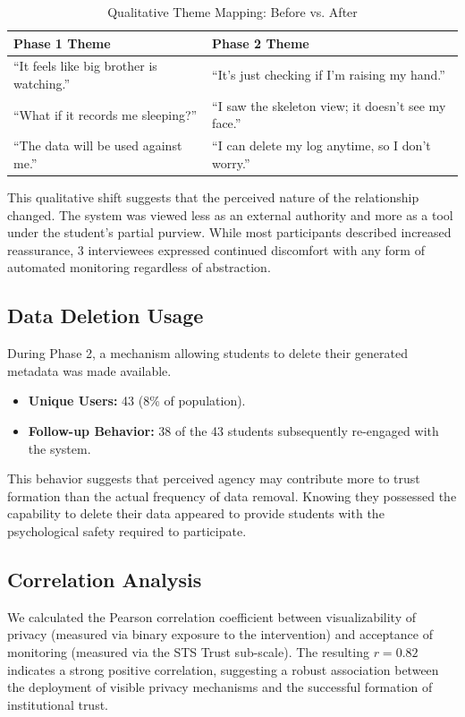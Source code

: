 \documentclass[conference]{IEEEtran}
\begin{document}
\begin{table}[htbp]
\caption{Qualitative Theme Mapping: Before vs. After}
\begin{center}
\begin{tabular}{|p{3cm}|p{4.5cm}|}
\hline
\textbf{Phase 1 Theme} & \textbf{Phase 2 Theme} \\
\hline
``It feels like big brother is watching.'' & ``It's just checking if I'm raising my hand.'' \\
\hline
``What if it records me sleeping?'' & ``I saw the skeleton view; it doesn't see my face.'' \\
\hline
``The data will be used against me.'' & ``I can delete my log anytime, so I don't worry.'' \\
\hline
\end{tabular}
\end{center}
\label{tab:themes}
\end{table}

This qualitative shift suggests that the perceived nature of the relationship changed. The system was viewed less as an external authority and more as a tool under the student's partial purview. While most participants described increased reassurance, 3 interviewees expressed continued discomfort with any form of automated monitoring regardless of abstraction.

\subsection{Data Deletion Usage}
During Phase 2, a mechanism allowing students to delete their generated metadata was made available.
\begin{itemize}
    \item \textbf{Unique Users:} 43 (8\% of population).
    \item \textbf{Follow-up Behavior:} 38 of the 43 students subsequently re-engaged with the system.
\end{itemize}
This behavior suggests that perceived agency may contribute more to trust formation than the actual frequency of data removal. Knowing they possessed the capability to delete their data appeared to provide students with the psychological safety required to participate. 

\subsection{Correlation Analysis}
We calculated the Pearson correlation coefficient between visualizability of privacy (measured via binary exposure to the intervention) and acceptance of monitoring (measured via the STS Trust sub-scale). The resulting $r=0.82$ indicates a strong positive correlation, suggesting a robust association between the deployment of visible privacy mechanisms and the successful formation of institutional trust.
\end{document}
